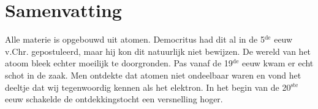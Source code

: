 \chapter{Samenvatting}\label{dutch-summary}


Alle materie is opgebouwd uit atomen. Democritus had dit al in de 5$^\text{de}$ eeuw v.Chr. gepostuleerd, maar hij kon dit natuurlijk
niet bewijzen. De wereld van het atoom bleek echter moeilijk te doorgronden. Pas vanaf de 19$^\text{de}$ eeuw kwam er echt schot in de zaak.
Men ontdekte dat atomen niet ondeelbaar waren en vond het deeltje dat wij tegenwoordig kennen als het elektron. 
In het begin van de 20$^\text{ste}$ eeuw schakelde de ontdekkingstocht een versnelling hoger.


